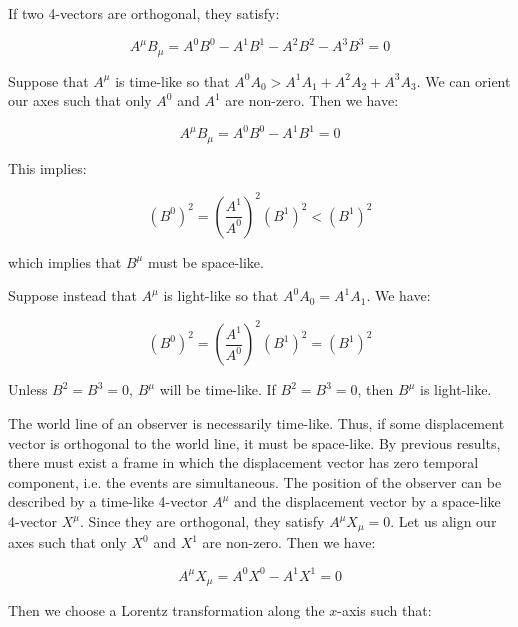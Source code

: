 \documentclass[12pt]{article}
\begin{document}
If two 4-vectors are orthogonal, they satisfy:

\begin{equation}
    A^{\mu} B_{\mu} = A^{0} B^{0} - A^{1} B^{1} - A^{2} B^{2} - A^{3} B^{3} = 0
\end{equation}

Suppose that $A^{\mu}$ is time-like so that $A^{0} A_{0} > A^{1} A_{1} + A^{2} A_{2} + A^{3} A_{3}$. We can orient our axes such that only $A^{0}$ and $A^{1}$ are non-zero. Then we have:

\begin{equation}
    A^{\mu} B_{\mu} = A^{0} B^{0} - A^{1} B^{1} = 0
\end{equation}

This implies:

\begin{equation}
    (B^{0})^{2} = \left( \frac{A^{1}}{A^{0}} \right)^{2} (B^{1})^{2} < (B^{1})^{2}
\end{equation}

which implies that $B^{\mu}$ must be space-like.

Suppose instead that $A^{\mu}$ is light-like so that $A^{0} A_{0} = A^{1} A_{1}$. We have:

\begin{equation}
    (B^{0})^{2} = \left( \frac{A^{1}}{A^{0}} \right)^{2} (B^{1})^{2} = (B^{1})^{2}
\end{equation}

Unless $B^{2} = B^{3} = 0$, $B^{\mu}$ will be time-like. If $B^{2} = B^{3} = 0$, then $B^{\mu}$ is light-like.

The world line of an observer is necessarily time-like. Thus, if some displacement vector is orthogonal to the world line, it must be space-like. By previous results, there must exist a frame in which the displacement vector has zero temporal component, i.e. the events are simultaneous. The position of the observer can be described by a time-like 4-vector $A^{\mu}$ and the displacement vector by a space-like 4-vector $X^{\mu}$. Since they are orthogonal, they satisfy $A^{\mu} X_{\mu} = 0$. Let us align our axes such that only $X^{0}$ and $X^{1}$ are non-zero. Then we have:

\begin{equation}
    A^{\mu} X_{\mu} = A^{0} X^{0} - A^{1} X^{1} = 0
\end{equation}

Then we choose a Lorentz transformation along the $x$-axis such that:
\end{document}
